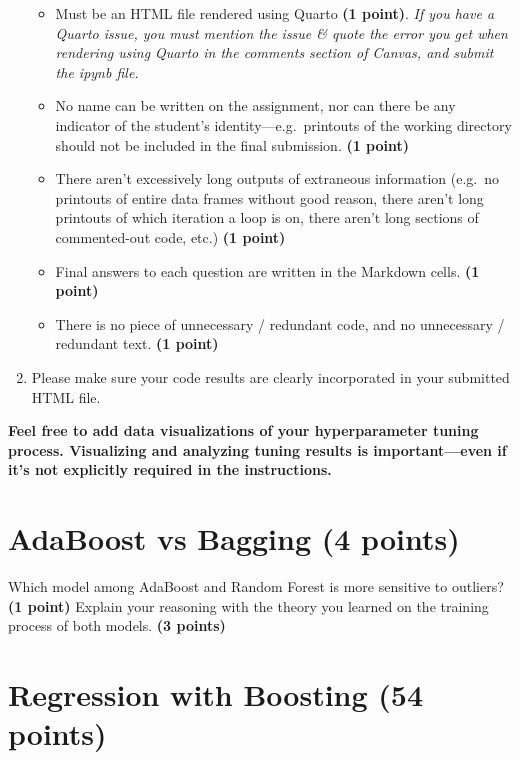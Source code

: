 \documentclass[
  letterpaper,
  DIV=11,
  numbers=noendperiod]{scrreprt}
\providecommand{\tightlist}{%
  \setlength{\itemsep}{0pt}\setlength{\parskip}{0pt}}\usepackage{longtable,booktabs,array}
\begin{document}
\begin{enumerate}
  \begin{itemize}
  \tightlist
  \item
    Must be an HTML file rendered using Quarto \textbf{(1 point)}.
    \emph{If you have a Quarto issue, you must mention the issue \&
    quote the error you get when rendering using Quarto in the comments
    section of Canvas, and submit the ipynb file.}
  \item
    No name can be written on the assignment, nor can there be any
    indicator of the student's identity---e.g.~printouts of the working
    directory should not be included in the final submission. \textbf{(1
    point)}
  \item
    There aren't excessively long outputs of extraneous information
    (e.g.~no printouts of entire data frames without good reason, there
    aren't long printouts of which iteration a loop is on, there aren't
    long sections of commented-out code, etc.) \textbf{(1 point)}
  \item
    Final answers to each question are written in the Markdown cells.
    \textbf{(1 point)}
  \item
    There is no piece of unnecessary / redundant code, and no
    unnecessary / redundant text. \textbf{(1 point)}
  \end{itemize}
\item
  Please make sure your code results are clearly incorporated in your
  submitted HTML file.
\end{enumerate}

\textbf{Feel free to add data visualizations of your hyperparameter
tuning process. Visualizing and analyzing tuning results is
important---even if it's not explicitly required in the instructions.}

\section{AdaBoost vs Bagging (4
points)}\label{adaboost-vs-bagging-4-points}

Which model among AdaBoost and Random Forest is more sensitive to
outliers? \textbf{(1 point)} Explain your reasoning with the theory you
learned on the training process of both models. \textbf{(3 points)}

\section{Regression with Boosting (54
points)}\label{regression-with-boosting-54-points}
\end{document}
